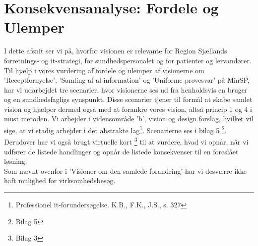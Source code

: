 %
%
%
%
%
%
%
%
%
%
%
%
%
%
%
%
%
%
%
%
%
%
%
%
%
%
%
%
%
%
%
\section{Konsekvensanalyse: Fordele og Ulemper}
I dette afsnit ser vi på, hvorfor visionen er relevante for Region Sjællands forretnings- og it-strategi, for sundhedspersonalet og for patienter og lervandører.\\
Til hjælp i vores vurdering af fordele og ulemper af visionerne om 'Receptfornyelse', 'Samling af al information' og 'Uniforme prøvesvar' på MinSP, har vi udarbejdet tre scenarier, hvor visionerne ses ud fra henholdsvis en bruger og en sundhedsfagligs synspunkt. Disse scenarier tjener til formål at skabe samlet vision og hjælper dermed også med at forankre vores vision, altså princip 1 og 4 i must metoden. Vi arbejder i vidensområde 'b', vision og design forslag, hvilket vil sige, at vi stadig arbejder i det abstrakte lag\footnote{Professionel it-forundersøgelse. K.B., F.K., J.S., s. 327}. Scenarierne ses i bilag 5 \footnote{Bilag 5}. \\
Derudover har vi også brugt virtuelle kort \footnote{Bilag 3} til at vurdere, hvad vi opnår, når vi udfører de listede handlinger og opnår de listede konsekvenser til en foreslået løsning.\\
Som nævnt ovenfor i 'Visioner om den samlede forandring' har vi desværre ikke haft mulighed for virksomhedsbesøg.
